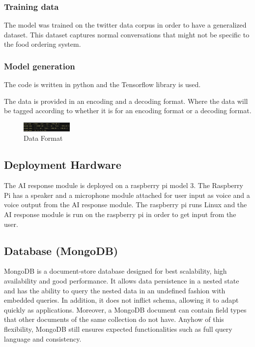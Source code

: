 \documentclass[conference]{IEEEtran}
\begin{document}
\bigskip

\subsubsection{Training data}
The model was trained on the twitter data corpus in order to have a generalized dataset. This dataset captures normal conversations that might not be specific to the food ordering system.

\bigskip

\subsubsection{Model generation}
The code is written in python and the Tensorflow library is used.

The data is provided in an encoding and a decoding format. Where the data will be tagged according to whether it is for an encoding format or a decoding format.

\begin{figure}[!ht]
	\centering
	\includegraphics[width=0.222\textwidth]{data_format.png}
	\caption{Data Format}
\end{figure}


\subsection{\textbf{Deployment Hardware}}

The AI response module is deployed on a raspberry pi model 3. The Raspberry Pi has a speaker and a microphone module attached for user input as voice and a voice output from the AI response module. The raspberry pi runs Linux and the AI response module is run on the raspberry pi in order to get input from the user. 

\subsection{\textbf{Database (MongoDB)}}
MongoDB is a document-store database designed for best scalability, high availability and good performance. It allows data persistence in a nested state and has the ability to query the nested data in an undefined fashion with embedded queries. In addition, it does not inflict schema, allowing it to adapt quickly as applications. Moreover, a MongoDB document can contain field types that other documents of the same collection do not have. Anyhow of this flexibility, MongoDB still ensures expected functionalities such as full query language and consistency.\\
\end{document}

